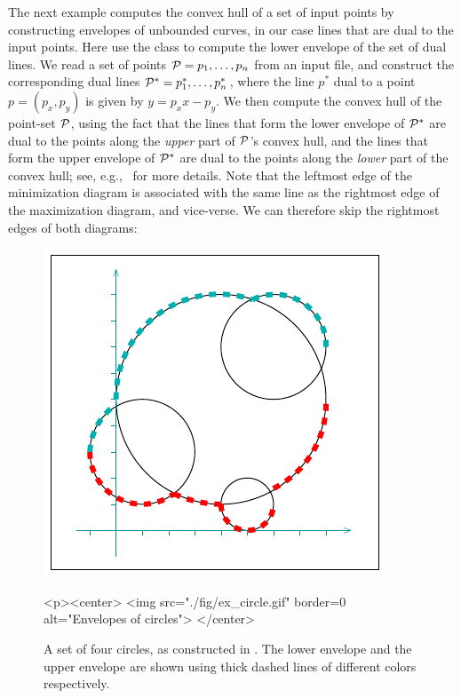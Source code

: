 
The next example computes the convex hull of a set of input points
by constructing envelopes of unbounded curves, in our case lines
that are dual to the input points. Here use the
 class to compute the lower envelope of the
set of dual lines. We read a set of points ${\cal P} = p_1, \ldots, p_n$
from an input file, and construct the corresponding dual lines
${\cal P}^{*} = p^{*}_1, \ldots, p^{*}_n$, where the line $p^{*}$ dual
to a point $p = (p_x, p_y)$ is given by $y = p_x x - p_y$. We then
compute the convex hull of the point-set ${\cal P}$, using the fact that
the lines that form the lower envelope of ${\cal P}^{*}$ are dual to the
points along the {\em upper} part of ${\cal P}$'s convex hull, and the
lines that form the upper envelope of ${\cal P}^{*}$ are dual to the
points along the {\em lower} part of the convex hull; see,
e.g.,~\cite[Section~11.4]{bkos-cgaa-00} for more details.
Note that the leftmost edge of the minimization diagram is associated
with the same line as the rightmost edge of the maximization diagram,
and vice-verse. We can therefore skip the rightmost edges of both
diagrams:


\begin{figure}[t]
\begin{ccTexOnly}
  \begin{center}
    \includegraphics{Envelope_2/fig/ex_circle}
  \end{center}
\end{ccTexOnly}
\begin{ccHtmlOnly}
  <p><center>
  <img src="./fig/ex_circle.gif" border=0 alt="Envelopes of circles">
  </center>
\end{ccHtmlOnly}
\caption{A set of four circles, as constructed in
. The lower envelope and the upper
envelope are shown using thick dashed lines of different colors
respectively.\label{env2_fig:ex_circ}}
\end{figure}

